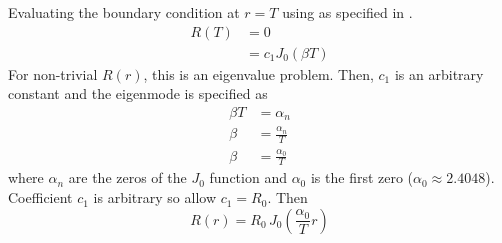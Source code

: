  Evaluating the boundary condition at $r=T$ using  as
  specified in .
  \begin{align}
    R(T) &= 0 \\
    &= c_1 J_0(\beta T)
  \end{align}
  For non-trivial $R(r)$, this is an eigenvalue problem. Then, $c_1$ is an
  arbitrary constant and the eigenmode is specified as
  \begin{align}
    \beta T &= \alpha_n \\
    \beta &= \frac{\alpha_n}{T} \\
    \label{eq:finite_cyl_beta}
    \beta &= \frac{\alpha_0}{T}
  \end{align}
  where $\alpha_n$ are the zeros of the $J_0$ function and $\alpha_0$ is the
  first zero ($\alpha_0 \approx 2.4048$). Coefficient $c_1$ is arbitrary so 
  allow $c_1 = R_0$. Then
  \begin{equation}
    \label{eq:finite_cyl_R}
    R(r) = R_0 \, J_0\left(\frac{\alpha_0}{T} r\right)
  \end{equation}

